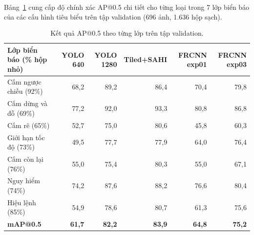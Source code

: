 \documentclass[11pt]{article}
\begin{document}
Bảng~\ref{tab:per_class} cung cấp độ chính xác AP@0.5 chi tiết cho từng loại trong 7 lớp biển báo của các cấu hình tiêu biểu trên tập validation (696 ảnh, 1.636 hộp sạch).

\begin{table}[t]
\centering
\small
\begin{tabular}{lrrrrr}
\toprule
\textbf{Lớp biển báo (\% hộp nhỏ)} & \textbf{YOLO 640} & \textbf{YOLO 1280} & \textbf{Tiled+SAHI} & \textbf{FRCNN exp01} & \textbf{FRCNN exp03} \\
\midrule
Cấm ngược chiều (92\%)  & 68,2 & 89,2 & 86,4 & 70,4 & 79,8 \\
Cấm dừng và đỗ (69\%)   & 77,2 & 92,0 & 93,3 & 80,8 & 86,8 \\
Cấm rẽ (65\%)           & 52,7 & 75,0 & 80,6 & 45,8 & 60,3 \\
Giới hạn tốc độ (73\%)  & 49,5 & 77,7 & 77,9 & 64,0 & 76,4 \\
Cấm còn lại (76\%)      & 55,0 & 75,4 & 80,3 & 55,0 & 67,1 \\
Nguy hiểm (74\%)        & 74,2 & 87,6 & 88,2 & 76,6 & 80,4 \\
Hiệu lệnh (85\%)        & 54,9 & 78,6 & 80,7 & 61,3 & 75,6 \\
\midrule
\textbf{mAP@0.5}        & \textbf{61,7} & \textbf{82,2} & \textbf{83,9} & \textbf{64,8} & \textbf{75,2} \\
\bottomrule
\end{tabular}
\caption{Kết quả AP@0.5 theo từng lớp trên tập validation.}
\label{tab:per_class}
\end{table}
\end{document}
